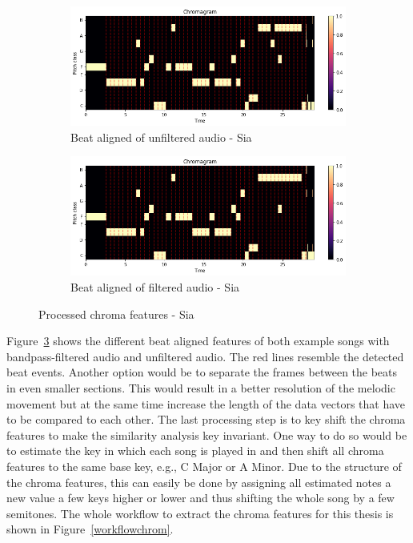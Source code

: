 \begin{figure}[htbp]
{{			\begin{subfigure}{.495\textwidth}
				\centering    
				\includegraphics[scale=0.3]{Images/Chroma/siaunfiltered.png}
				\caption{Beat aligned of unfiltered audio - Sia}
				\label{siaub}
			\end{subfigure}
			\begin{subfigure}{.495\textwidth}
				\centering     
				\includegraphics[scale=0.3]{Images/Chroma/siafiltered.png}
				\caption{Beat aligned of filtered audio - Sia}
				\label{siafb}
			\end{subfigure}%
	}}
	\caption{Processed chroma features - Sia}
	\label{beataligned}
\end{figure}

\noindent Figure~\ref{beataligned} shows the different beat aligned features of both example songs with bandpass-filtered audio and unfiltered audio. The red lines resemble the detected beat events.
\noindent Another option would be to separate the frames between the beats in even smaller sections. This would result in a better resolution of the melodic movement but at the same time increase the length of the data vectors that have to be compared to each other.
\noindent The last processing step is to key shift the chroma features to make the similarity analysis key invariant. One way to do so would be to estimate the key in which each song is played in and then shift all chroma features to the same base key, e.g., C Major or A Minor. Due to the structure of the chroma features, this can easily be done by assigning all estimated notes a new value a few keys higher or lower and thus shifting the whole song by a few semitones. The whole workflow to extract the chroma features for this thesis is shown in Figure~\ref{workflowchrom}.\\

